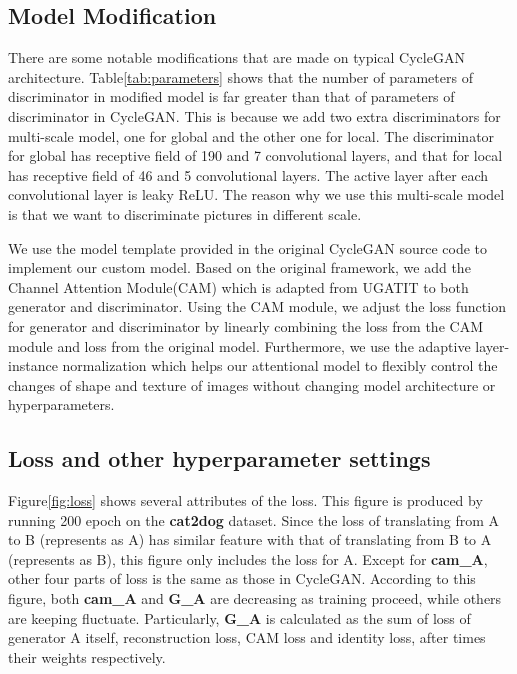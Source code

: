\documentclass{article}
\begin{document}
\subsection{Model Modification}

There are some notable modifications that are made on typical CycleGAN architecture. Table\ref{tab:parameters} shows that the number of parameters of discriminator in modified model is far greater than that of parameters of discriminator in CycleGAN. This is because we add two extra discriminators for multi-scale model, one for global and the other one for local. The discriminator for global has receptive field of 190 and 7 convolutional layers, and that for local has receptive field of 46 and 5 convolutional layers. The active layer after each convolutional layer is leaky ReLU. The reason why we use this multi-scale model is that we want to discriminate pictures in different scale.


We use the model template provided in the original CycleGAN source code to implement our custom model. Based on the original framework, we add the Channel Attention Module(CAM) which is adapted from UGATIT to both generator and discriminator\cite{U-GAT-IT}. Using the CAM module, we adjust the loss function for generator and discriminator by linearly combining the loss from the CAM module and loss from the original model. Furthermore, we use the adaptive layer-instance normalization which helps our attentional model to flexibly control the changes of shape and texture of images without changing model architecture or hyperparameters.

\subsection{Loss and other hyperparameter settings}

Figure\ref{fig:loss} shows several attributes of the loss. This figure is produced by running 200 epoch on the \textbf{cat2dog} dataset. Since the loss of translating from A to B (represents as A) has similar feature with that of translating from B to A (represents as B), this figure only includes the loss for A. Except for \textbf{cam\_A}, other four parts of loss is the same as those in CycleGAN. According to this figure, both \textbf{cam\_A} and \textbf{G\_A} are decreasing as training proceed, while others are keeping fluctuate. Particularly, \textbf{G\_A} is calculated as the sum of loss of generator A itself, reconstruction loss, CAM loss and identity loss, after times their weights respectively. 
\end{document}
